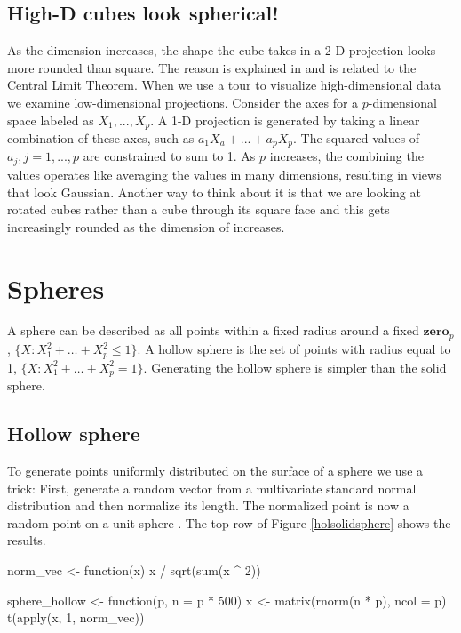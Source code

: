\subsection{High-D cubes look spherical!}

As the dimension increases, the shape the cube takes in a 2-D
projection looks more rounded than square. The reason is explained in
\citet{DF84} and is related to the Central Limit Theorem. When we use
a tour to visualize high-dimensional data we examine low-dimensional
projections.  Consider the axes for a $p$-dimensional space labeled as
$X_1, ..., X_p$. A 1-D projection is generated by taking a linear
combination of these axes, such as $a_1X_a+...+a_pX_p$. The squared
values of $a_j, j=1, ..., p$ are constrained to sum to 1. As $p$
increases, the combining the values operates like averaging the values
in many dimensions, resulting in views that look Gaussian. Another way
to think about it is that we are looking at rotated cubes rather than
a cube through its square face and this gets increasingly rounded as
the dimension of increases.


\section{Spheres}

A sphere can be described as all
points within a fixed radius around a fixed {$\mathbf{zero}_p$}, $\{X: X_1^2+\dots + X_p^2 \leq 1\}$.  A hollow sphere is the set of points with radius equal to 1, $\{X: X_1^2+\dots + X_p^2 = 1\}$. Generating the hollow sphere is simpler than the solid sphere.

\subsection{Hollow sphere}

To generate points uniformly distributed on the surface of a sphere we
use a trick: First, generate a random vector from a multivariate
standard normal distribution and then normalize its length. The normalized point is now a random point on a unit sphere \citep[2.6]{StatSphere}. The top
row of Figure \ref{holsolidsphere} shows the results.

\begin{example}
norm_vec <- function(x) {
  x / sqrt(sum(x ^ 2))
}

sphere_hollow <- function(p, n = p * 500) {
  x <- matrix(rnorm(n * p), ncol = p)
  t(apply(x, 1, norm_vec))
}
\end{example}

